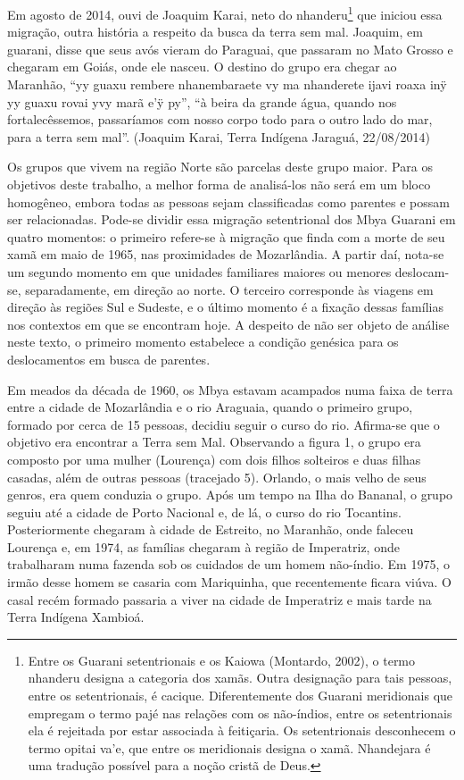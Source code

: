 {{Em agosto de 2014, ouvi de Joaquim Karai, neto do
nhanderu\footnote{Entre os Guarani setentrionais e os Kaiowa (Montardo,
2002), o termo nhanderu designa a categoria dos xamãs. Outra designação
para tais pessoas, entre os setentrionais, é cacique. Diferentemente
dos Guarani meridionais que empregam o termo pajé nas relações com os
não-índios, entre os setentrionais ela é rejeitada por estar associada à
feitiçaria. Os setentrionais desconhecem o termo opitai va’e, que entre
os meridionais designa o xamã. Nhandejara é uma tradução possível para
a noção cristã de Deus.} que iniciou essa migração, outra história a
respeito da busca da terra sem mal. Joaquim, em guarani, disse que seus
avós vieram do Paraguai, que passaram no Mato Grosso e chegaram em
Goiás, onde ele nasceu. O destino do grupo era chegar ao Maranhão, ``yy
guaxu rembere nhanembaraete vy ma nhanderete ijavi roaxa inÿ yy guaxu
rovai yvy marã e’ÿ py'', ``à beira da grande água, quando nos
fortalecêssemos, passaríamos com nosso corpo todo para o outro lado do
mar, para a terra sem mal''. (Joaquim Karai, Terra Indígena Jaraguá,
22/08/2014)

Os grupos que vivem na região Norte são parcelas deste grupo maior. Para
os objetivos deste trabalho, a melhor forma de analisá-los não será em
um bloco homogêneo, embora todas as pessoas sejam classificadas como
parentes e possam ser relacionadas. Pode-se dividir essa migração
setentrional dos Mbya Guarani em quatro momentos: o primeiro refere-se
à migração que finda com a morte de seu xamã em maio de 1965, nas
proximidades de Mozarlândia. A partir daí, nota-se um segundo momento
em que unidades familiares maiores ou menores deslocam-se,
separadamente, em direção ao norte. O terceiro corresponde às viagens
em direção às regiões Sul e Sudeste, e o último momento é a fixação
dessas famílias nos contextos em que se encontram hoje. A despeito de
não ser objeto de análise neste texto, o primeiro momento estabelece a
condição genésica para os deslocamentos em busca de parentes.

Em meados da década de 1960, os Mbya estavam acampados numa faixa de
terra entre a cidade de Mozarlândia e o rio Araguaia, quando o primeiro
grupo, formado por cerca de 15 pessoas, decidiu seguir o curso do rio.
Afirma-se que o objetivo era encontrar a Terra sem Mal. Observando a
figura 1, o grupo era composto por uma mulher (Lourença) com dois
filhos solteiros e duas filhas casadas, além de outras pessoas
(tracejado 5). Orlando, o mais velho de seus genros, era quem conduzia
o grupo. Após um tempo na Ilha do Bananal, o grupo seguiu até a cidade
de Porto Nacional e, de lá, o curso do rio Tocantins. Posteriormente
chegaram à cidade de Estreito, no Maranhão, onde faleceu Lourença e, em
1974, as famílias chegaram à região de Imperatriz, onde trabalharam
numa fazenda sob os cuidados de um homem não-índio. Em 1975, o irmão
desse homem se casaria com Mariquinha, que recentemente ficara viúva. O
casal recém formado passaria a viver na cidade de Imperatriz e mais
tarde na Terra Indígena Xambioá. 

}}
